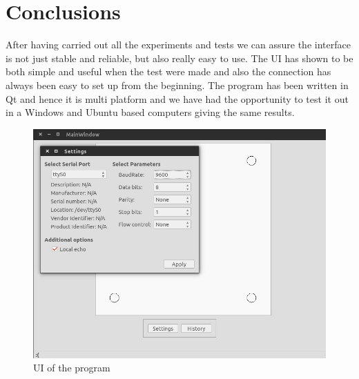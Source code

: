 	\section{Conclusions} %
	\label{sec:high_level_programming_conclusions}
		After having carried out all the experiments and tests we can assure the interface is not just stable and reliable, but also really easy to use. 
		The UI has shown to be both simple and useful when the test were made and also the connection has always been easy to set up from the beginning.
		The program has been written in Qt and hence it is multi platform and we have had the opportunity to test it out in a Windows and Ubuntu based computers giving the same results.
		\begin{figure}[hb!]
			\begin{center}
				\includegraphics[width=.8\textwidth]{figures/UI}
			\end{center}
			\caption{UI of the program}
			\label{fig:ui}
		\end{figure}